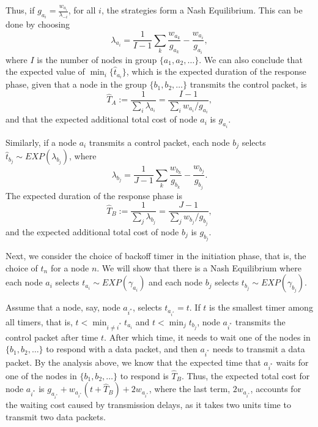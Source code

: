 \documentclass[11pt, conference]{IEEEtran}
\begin{document}
Thus, if $g_{a_i}=\frac{w_{a_i}}{\lambda_{-i}}$, for all $i$, the strategies form a Nash Equilibrium. This can be done by choosing
\begin{equation}	\label{equation:bilateral:lambdaA}
\lambda_{a_i}=\frac{1}{I-1}\sum_{k}\frac{w_{a_k}}{g_{a_k}}-\frac{w_{a_i}}{g_{a_i}},
\end{equation}
where $I$ is the number of nodes in group $\{a_1,a_2,\dots\}$. We can also conclude that the expected value of $\min_i\{\hat{t}_{a_i}\}$, which is the expected duration of the response phase, given that a node in the group $\{b_1,b_2,\dots\}$ transmits the control packet, is
\begin{equation}	\label{equation:bilateral:hatTA}
\hat{T}_A:=\frac{1}{\sum_{i}\lambda_{a_i}}=\frac{I-1}{\sum_i w_{a_i}/g_{a_i}},
\end{equation}
and that the expected additional total cost of node $a_i$ is $g_{a_i}$.

Similarly, if a node $a_i$ transmits a control packet, each node $b_j$ selects $\hat{t}_{b_j}\sim EXP(\lambda_{b_j})$, where
\begin{equation}	\label{equation:bilateral:lambdaB}
\lambda_{b_j}=\frac{1}{J-1}\sum_{k}\frac{w_{b_k}}{g_{b_k}}-\frac{w_{b_j}}{g_{b_j}}.
\end{equation}
The expected duration of the response phase is
\begin{equation}\label{equation:bilateral:hatTB}
\hat{T}_B:=\frac{1}{\sum_{j}\lambda_{b_j}}=\frac{J-1}{\sum_j w_{b_j}/g_{b_j}},
\end{equation}
and the expected additional total cost of node $b_j$ is $g_{b_j}$.

Next, we consider the choice of backoff timer in the initiation phase, that is, the choice of $t_{n}$ for a node $n$. We will show that there is a Nash Equilibrium where each node $a_i$ selects $t_{a_i}\sim EXP(\gamma_{a_i})$ and each node $b_j$ selects $t_{b_j}\sim EXP(\gamma_{b_j})$.

Assume that a node, say, node $a_{i^*}$, selects $t_{a_{i^*}}=t$. If $t$ is the smallest timer among all timers, that is, $t<\min_{i\neq i^*}t_{a_i}$ and $t<\min_jt_{b_j}$, node $a_{i^*}$ transmits the control packet after time $t$. After which time, it needs to wait one of the nodes in $\{b_1,b_2,\dots\}$ to respond with a data packet, and then $a_{i^*}$ needs to transmit a data packet. By the analysis above, we know that the expected time that $a_{i^*}$ waits for one of the nodes in $\{b_1,b_2,\dots\}$ to respond is $\hat{T}_B$. Thus, the expected total cost for node $a_{i^*}$ is $g_{a_{i^*}}+w_{a_{i^*}}(t+\hat{T}_B)+2w_{a_{i^*}}$, where the last term, $2w_{a_{i^*}}$, accounts for the waiting cost caused by transmission delays, as it takes two units time to transmit two data packets.
\end{document}
